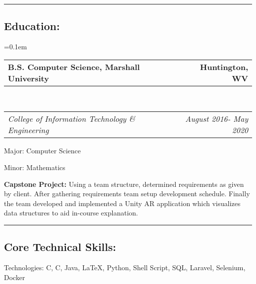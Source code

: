\documentclass[11pt,letterpaper]{article}
\makeatletter
\newenvironment{indentsection}[1]%
{\begin{list}{}%
	{\setlength{\leftmargin}{#1}}%
	\item[]%
}
{\end{list}}
\newcommand{\headerrow}[2]
{\begin{tabular*}{\linewidth}{l@{\extracolsep{\fill}}r}
	#1 &
	#2 \\
\end{tabular*}}
\newcommand{\CPP}
{C\nolinebreak[4]\hspace{-.05em}\raisebox{.22ex}{\footnotesize\bf ++}}
\makeatother
\begin{document}
	


\hrule
\vspace{-0.4em}
\subsection*{\Large{Education:}}

	\parskip=0.1em

	\headerrow
		{\textbf{B.S. Computer Science, Marshall University}}
		{\textbf{Huntington, WV}}
	\\
	\headerrow
		{\emph{College of Information Technology \& Engineering}}
		{\emph{August 2016- May 2020}}
	\begin{itemize*}
		\item Major: Computer Science
		\item Minor: Mathematics
	\end{itemize*}
	\begin{description*}
	\item[\textbf{Capstone Project:}] 
	Using a team structure, determined requirements as given by client. After gathering requirements team setup development schedule. Finally the team developed and implemented a Unity AR application which visualizes data structures to aid in-course explanation.
	
	\end{description*}


\hrule
\vspace{-0.4em}
\subsection*{\Large{Core Technical Skills:}}

\begin{indentsection}{\parindent}
\begin{description*}
	\item[Technologies:]
	C, \CPP, Java, \LaTeX, Python, Shell Script, SQL, Laravel, Selenium, Docker
\end{description*}
\end{indentsection}
\end{document}
